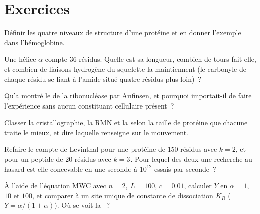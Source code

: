 \section{Exercices}

\begin{exercise}[$\star$]\label{exo:b3:structural-biology:1}
Définir les quatre niveaux de structure d'une protéine et en donner
l'exemple dans l'hémoglobine.
\end{exercise}

\begin{exercise}[$\star$]\label{exo:b3:structural-biology:2}
Une hélice $\alpha$ compte $36$ résidus. Quelle est sa longueur,
combien de tours fait-elle, et combien de liaisons hydrogène du
squelette la maintiennent (le carbonyle de chaque résidu se liant à
l'amide situé quatre résidus plus loin)~?
\end{exercise}

\begin{exercise}[$\star$]\label{exo:b3:structural-biology:3}
Qu'a montré le  de la ribonucléase par Anfinsen, et pourquoi
importait-il de faire l'expérience sans aucun constituant cellulaire
présent~?
\end{exercise}

\begin{exercise}[$\star$]\label{exo:b3:structural-biology:4}
Classer la cristallographie, la RMN et la 
selon la taille de protéine que chacune traite le mieux, et dire
laquelle renseigne sur le mouvement.
\end{exercise}

\begin{exercise}[$\star\star$]\label{exo:b3:structural-biology:5}
Refaire le compte de Levinthal pour une protéine de $150$ résidus avec
$k = 2$, et pour un peptide de $20$ résidus avec $k = 3$. Pour lequel
des deux une recherche au hasard est-elle concevable en une seconde à
$10^{12}$ essais par seconde~?
\end{exercise}

\begin{exercise}[$\star\star$]\label{exo:b3:structural-biology:6}
À l'aide de l'équation MWC avec $n = 2$, $L = 100$, $c = 0.01$,
calculer $Y$ en $\alpha = 1$, $10$ et $100$, et comparer à un site
unique de constante de dissociation $K_{R}$ ($Y = \alpha/(1+\alpha)$).
Où se voit la ~?
\end{exercise}


